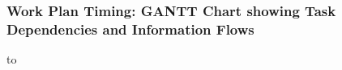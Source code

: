 \documentclass[a4paper,11pt]{article}
\newcommand{\project}[1]{\textbf{#1}\xspace}
\newcommand{\BLESS}{\project{BLeSS}}
\newcommand{\TheProject}{\BLESS}
\begin{document}





\landscape

\subsubsection*{Work Plan Timing: GANTT Chart showing Task Dependencies and Information Flows}


\centerline{\hbox to }
\label{fig:gantt}
\vspace{-1in} %
\endlandscape
\end{document}

